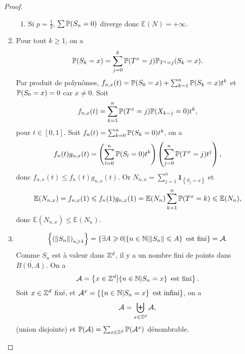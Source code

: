 \documentclass[12pt]{article}
\begin{document}
\begin{proof}
\begin{enumerate}
\begin{enumerate}
            \item Si $p=\frac{1}{2}$, $\sum\P(S_n=0)$ diverge donc $\mathbb{E}(N)=+\infty$.
        \end{enumerate}

        \item Pour tout $k\geqslant1$, on a 
        \begin{equation}
            \P(S_k=x)=\sum_{j=0}^{k}\P(T^{x}=j)\P_{T^{x}=j}(S_k=x).
        \end{equation}
        Par produit de polynômes, $f_{n,x}(t)=\P(S_0=x)+\sum_{k=1}^{n}\P(S_k=x)t^{k}$ et $\P(S_0=x)=0$ car $x\neq0$. Soit 
        \begin{equation}
            f_{n,x}(t)=\sum_{k=1}^{n}\P(T^{x}=j)\P(X_{k-j}=0)t^{k},
        \end{equation}
        pour $t\in[0,1]$. Soit $f_n(t)=\sum_{k=0}^{n}\P(S_k=0)t^{k}$, on a 
        \begin{equation}
            f_n(t)g_{n,x}(t)=\left(\sum_{l=0}^{n}\P(S_l=0)t^{k}\right)\left(\sum_{j=0}^{n}\P(T^{x}=j)t^{j}\right),
        \end{equation}
        donc $f_{n,x}(t)\leqslant f_n(t)g_{n,x}(t)$. Or $N_{n,x}=\sum_{j=1}^{n}\mathbf{1}_{\left\lbrace S_j=x\right\rbrace}$ et 
        \begin{equation}
            \mathbb{E}(N_{n,x})=f_{n,x}(1)\leqslant f_n(1)g_{n,x}(1)=\mathbb{E}(N_{n})\sum_{k=1}^{n}\P(T^{x}=k)\leqslant\mathbb{E}(N_{n}),
        \end{equation}
        donc $\mathbb{E}(N_{n,x})\leqslant\mathbb{E}(N_{n})$.

        \item 
        \begin{equation}
            \left\lbrace \left(\left\lVert S_n\right\rVert\right)_{n\geqslant1}\right\rbrace=\left\lbrace\exists A\geqslant0\middle|\left\lbrace n\in\N\middle|\left\lVert S_n\right\rVert\leqslant A\right\rbrace\text{ est fini}\right\rbrace=\mathcal{A}.    
        \end{equation}
        Comme $S_n$ est à valeur dans $\Z^{d}$, il y a un nombre fini de points dans $\overline{B(0,A)}$. On a 
        \begin{equation}
            \mathcal{A}=\left\lbrace x\in\Z^{d}\middle|\left\lbrace n\in\N\middle| S_n=x\right\rbrace\text{ est fini}\right\rbrace.
        \end{equation}
        Soit $x\in\Z^{d}$ fixé, et $\mathcal{A}^{x}=\left\lbrace\left\lbrace n\in\N\middle| S_n=x\right\rbrace\text{ est infini}\right\rbrace$, on a 
        \begin{equation}
            \mathcal{A}=\biguplus_{x\in\Z^{d}}\mathcal{A},
        \end{equation}
        (union disjointe) et $\P(\mathcal{A})=\sum_{x\in\Z^{d}}\P(\mathcal{A}^{x})$ dénombrable.


\end{enumerate}
\end{proof}
\end{document}
